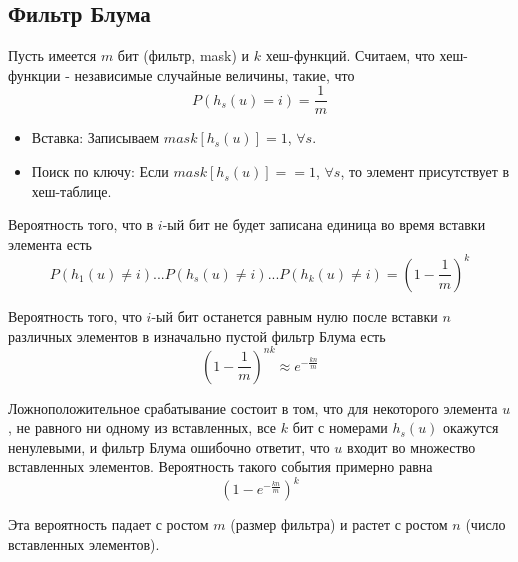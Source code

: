 \subsection {Фильтр Блума}
Пусть имеется $m$ бит (фильтр, mask) и $k$ хеш-функций. Считаем, что хеш-функции - независимые случайные величины, такие, что 
$$P(h_s(u) = i) = \frac{1}{m}$$

\begin{itemize}
\item Вставка: Записываем $mask[h_s(u)] = 1$, $\forall s$.
\item Поиск по ключу: Если $mask[h_s(u)] == 1$, $\forall s$, то элемент присутствует в хеш-таблице.
\end{itemize}

Вероятность того, что в $i$-ый бит не будет записана единица во время вставки элемента есть 
$$P(h_1(u) \ne i)...P(h_s(u) \ne i)...P(h_k(u) \ne i) = \left( 1 - \frac{1}{m}\right)^k$$

Вероятность того, что $i$-ый бит останется равным нулю после вставки $n$ различных элементов в изначально пустой фильтр Блума есть 
$$\left( 1 - \frac{1}{m}\right)^{nk} \approx e^{-\frac{kn}{m}}$$

Ложноположительное срабатывание состоит в том, что для некоторого элемента $u$, не равного ни одному из вставленных, все $k$ бит с номерами $h_s(u)$ окажутся ненулевыми, и фильтр Блума ошибочно ответит, что $u$ входит во множество вставленных элементов. Вероятность такого события примерно равна
$$(1 - e^{-\frac{kn}{m}})^k$$

Эта вероятность падает с ростом $m$ (размер фильтра) и растет с ростом $n$ (число вставленных элементов).